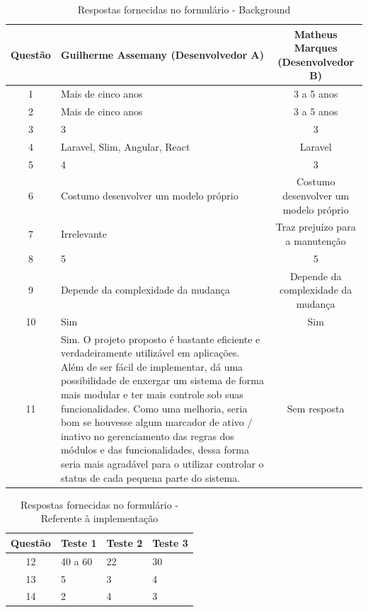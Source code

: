 \begin{center}
  \begin{table}
  \label{tabela1}
  \caption{Respostas fornecidas no formulário - Background}
    \begin{tabular}{| c | p{7cm} | c |}
      \hline
      Questão & Guilherme Assemany (Desenvolvedor A)& Matheus Marques (Desenvolvedor B)\\
      \hline
      1 & Mais de cinco anos & 3 a 5 anos\\ \hline
      2 & Mais de cinco anos & 3 a 5 anos\\ \hline
      3 & 3 & 3\\ \hline
      4 & Laravel, Slim, Angular, React & Laravel\\ \hline
      5 & 4 & 3\\ \hline
      6 & Costumo desenvolver um modelo próprio & Costumo desenvolver um modelo próprio\\ \hline
      7 & Irrelevante & Traz prejuízo para a manutenção\\ \hline
      8 & 5 & 5\\ \hline
      9 & Depende da complexidade da mudança & Depende da complexidade da mudança\\ \hline
      10 & Sim & Sim\\ \hline
      11 & Sim. O projeto proposto é bastante eficiente e verdadeiramente utilizável em aplicações. Além de ser fácil de implementar, dá uma possibilidade de enxergar um sistema de forma mais modular e ter mais controle sob suas funcionalidades. Como uma melhoria, seria bom se houvesse algum marcador de ativo / inativo no gerenciamento das regras dos módulos e das funcionalidades, dessa forma seria mais agradável para o utilizar controlar o status de cada pequena parte do sistema.
 & Sem resposta\\ \hline
    \end{tabular}
  \end{table}
\end{center}

\begin{center}
  \begin{table}
  \label{tabela2}
  \caption{Respostas fornecidas no formulário - Referente à implementação}
    \begin{tabular}{| c | p{5cm} | p{4cm} | p{4cm} |}
      \hline
      Questão & Teste 1& Teste 2 & Teste 3\\
      \hline
	  12 & 40 a 60 & 22 & 30\\ \hline
      13 & 5 & 3 & 4\\ \hline
      14 & 2 & 4 & 3\\ \hline
\end{tabular}
  \end{table}
\end{center}

